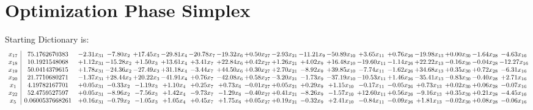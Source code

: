 \documentclass[9pt]{article}
\begin{document}
\section{Optimization Phase Simplex}
Starting Dictionary is:
\[\begin{array}{c| c c@{\hskip 2pt} c@{\hskip 2pt} c@{\hskip 2pt} c@{\hskip 2pt} c@{\hskip 2pt} c@{\hskip 2pt} c@{\hskip 2pt} c@{\hskip 2pt} c@{\hskip 2pt} c@{\hskip 2pt} c@{\hskip 2pt} c@{\hskip 2pt} c@{\hskip 2pt} c@{\hskip 2pt} c@{\hskip 2pt} c@{\hskip 2pt} }
 x_{17}   &  75.1762670383 & -2.31 x_{31} & -7.80 x_{2} & + 17.45 x_{3} & -29.81 x_{4} & -20.78 x_{7} & -19.32 x_{6} & +  0.50 x_{27} & -2.93 x_{21} & -11.21 x_{9} & -50.89 x_{10} & +  3.65 x_{11} & +  0.76 x_{26} & -19.98 x_{13} & +  0.00 x_{30} & -1.64 x_{28} & -4.63 x_{16}\\
 x_{18}   &  10.1921548068 & +  1.12 x_{31} & -15.28 x_{2} & +  1.50 x_{3} & + 13.61 x_{4} & +  3.41 x_{7} & + 22.84 x_{6} & +  0.42 x_{27} & +  1.26 x_{21} & +  4.02 x_{9} & + 16.48 x_{10} & -19.60 x_{11} & -1.14 x_{26} & + 22.22 x_{13} & -0.16 x_{30} & -0.04 x_{28} & -12.27 x_{16}\\
 x_{19}   &  50.0414379615 & +  1.78 x_{31} & -24.36 x_{2} & -27.49 x_{3} & + 31.18 x_{4} & -3.44 x_{7} & + 44.50 x_{6} & +  0.30 x_{27} & +  2.70 x_{21} & -8.92 x_{9} & + 39.85 x_{10} & -7.74 x_{11} & -1.62 x_{26} & + 34.68 x_{13} & +  0.35 x_{30} & +  0.72 x_{28} & -6.31 x_{16}\\
 x_{20}   &  21.7710680271 & -1.37 x_{31} & + 28.44 x_{2} & + 20.22 x_{3} & -41.91 x_{4} & +  0.76 x_{7} & -42.08 x_{6} & +  0.58 x_{27} & -3.20 x_{21} & -1.73 x_{9} & -37.19 x_{10} & -10.53 x_{11} & +  1.46 x_{26} & -35.41 x_{13} & -0.83 x_{30} & -0.40 x_{28} & +  2.71 x_{16}\\
 x_{1}   &  4.19782167701 & +  0.05 x_{31} & -0.33 x_{2} & -1.19 x_{3} & +  1.10 x_{4} & +  0.25 x_{7} & +  0.73 x_{6} & -0.01 x_{27} & +  0.05 x_{21} & +  0.29 x_{9} & +  1.15 x_{10} & -0.17 x_{11} & -0.05 x_{26} & +  0.73 x_{13} & +  0.02 x_{30} & +  0.06 x_{28} & -0.07 x_{16}\\
 x_{22}   &  52.4759527597 & +  0.05 x_{31} & -8.96 x_{2} & -7.56 x_{3} & +  1.42 x_{4} & -9.73 x_{7} & -1.29 x_{6} & -0.40 x_{27} & +  0.41 x_{21} & -8.26 x_{9} & -1.57 x_{10} & + 12.60 x_{11} & +  0.56 x_{26} & -9.16 x_{13} & +  0.35 x_{30} & +  0.21 x_{28} & -4.45 x_{16}\\
 x_{5}   &  0.0600537668261 & +  0.16 x_{31} & -0.79 x_{2} & -1.05 x_{3} & +  1.05 x_{4} & +  0.45 x_{7} & +  1.75 x_{6} & +  0.05 x_{27} & +  0.19 x_{21} & -0.32 x_{9} & +  2.41 x_{10} & -0.84 x_{11} & -0.09 x_{26} & +  1.81 x_{13} & -0.02 x_{30} & +  0.08 x_{28} & -0.06 x_{16}\\

\end{array}\]
\end{document}
